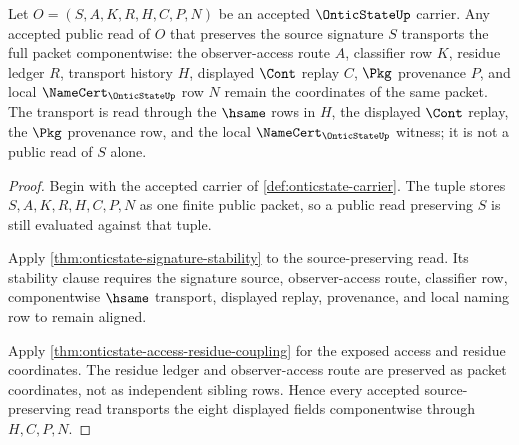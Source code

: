 \begin{theorem}
\label{thm:onticstate-componentwise-transport-scope}
Let $O=(S,A,K,R,H,C,P,N)$ be an accepted $\OnticStateUp$ carrier. Any accepted public read of $O$ that preserves the source signature $S$ transports the full packet componentwise: the observer-access route $A$, classifier row $K$, residue ledger $R$, transport history $H$, displayed $\Cont$ replay $C$, $\Pkg$ provenance $P$, and local $\NameCert_{\OnticStateUp}$ row $N$ remain the coordinates of the same packet. The transport is read through the $\hsame$ rows in $H$, the displayed $\Cont$ replay, the $\Pkg$ provenance row, and the local $\NameCert_{\OnticStateUp}$ witness; it is not a public read of $S$ alone.
\end{theorem}
\begin{proof}
Begin with the accepted carrier of \autoref{def:onticstate-carrier}. The tuple stores $S,A,K,R,H,C,P,N$ as one finite public packet, so a public read preserving $S$ is still evaluated against that tuple.

Apply \autoref{thm:onticstate-signature-stability} to the source-preserving read. Its stability clause requires the signature source, observer-access route, classifier row, componentwise $\hsame$ transport, displayed replay, provenance, and local naming row to remain aligned.

Apply \autoref{thm:onticstate-access-residue-coupling} for the exposed access and residue coordinates. The residue ledger and observer-access route are preserved as packet coordinates, not as independent sibling rows. Hence every accepted source-preserving read transports the eight displayed fields componentwise through $H,C,P,N$.
\end{proof}

